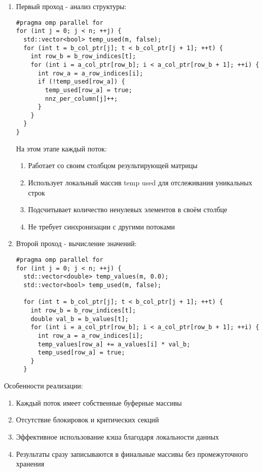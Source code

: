 \documentclass[12pt]{article}
\begin{document}
\begin{enumerate}
\item Первый проход - анализ структуры:
\begin{lstlisting}
#pragma omp parallel for
for (int j = 0; j < n; ++j) {
  std::vector<bool> temp_used(m, false);
  for (int t = b_col_ptr[j]; t < b_col_ptr[j + 1]; ++t) {
    int row_b = b_row_indices[t];
    for (int i = a_col_ptr[row_b]; i < a_col_ptr[row_b + 1]; ++i) {
      int row_a = a_row_indices[i];
      if (!temp_used[row_a]) {
        temp_used[row_a] = true;
        nnz_per_column[j]++;
      }
    }
  }
}
\end{lstlisting}
На этом этапе каждый поток:
\begin{enumerate}
\item Работает со своим столбцом результирующей матрицы
\item Использует локальный массив temp used для отслеживания уникальных строк
\item Подсчитывает количество ненулевых элементов в своём столбце
\item Не требует синхронизации с другими потоками
\end{enumerate}

\item Второй проход - вычисление значений:
\begin{lstlisting}
#pragma omp parallel for
for (int j = 0; j < n; ++j) {
  std::vector<double> temp_values(m, 0.0);
  std::vector<bool> temp_used(m, false);

  for (int t = b_col_ptr[j]; t < b_col_ptr[j + 1]; ++t) {
    int row_b = b_row_indices[t];
    double val_b = b_values[t];
    for (int i = a_col_ptr[row_b]; i < a_col_ptr[row_b + 1]; ++i) {
      int row_a = a_row_indices[i];
      temp_values[row_a] += a_values[i] * val_b;
      temp_used[row_a] = true;
    }
  }
\end{lstlisting}
\end{enumerate}

Особенности реализации:
\begin{enumerate}
\item Каждый поток имеет собственные буферные массивы
\item Отсутствие блокировок и критических секций
\item Эффективное использование кэша благодаря локальности данных
\item Результаты сразу записываются в финальные массивы без промежуточного хранения
\end{enumerate}
\end{document}
